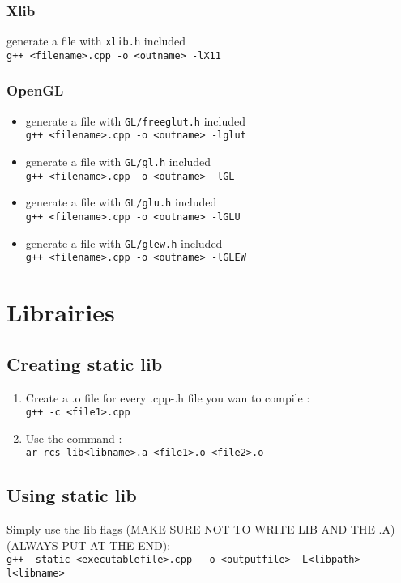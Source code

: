 \documentclass[12pt]{article}
\begin{document}
\subsubsection{Xlib}
generate a file with \verb|xlib.h| included \\ \verb|g++ <filename>.cpp -o <outname> -lX11|
\subsubsection{OpenGL}
\begin{itemize}
 \item generate a file with \verb|GL/freeglut.h| included \\ \verb|g++ <filename>.cpp -o <outname> -lglut|
 \item generate a file with \verb|GL/gl.h| included \\ \verb|g++ <filename>.cpp -o <outname> -lGL|
 \item generate a file with \verb|GL/glu.h| included \\ \verb|g++ <filename>.cpp -o <outname> -lGLU|
 \item generate a file with \verb|GL/glew.h| included \\ \verb|g++ <filename>.cpp -o <outname> -lGLEW|
\end{itemize}


\newpage
\section{Librairies}
\subsection{Creating static lib}
\begin{enumerate}
 \item Create a .o file for every .cpp-.h file you wan to compile : \\
       \verb|g++ -c <file1>.cpp|
 \item Use the command :\\
       \verb|ar rcs lib<libname>.a <file1>.o <file2>.o|
\end{enumerate}
\subsection{Using static lib}
Simply use the lib flags (MAKE SURE NOT TO WRITE LIB AND THE .A) (ALWAYS PUT AT THE END):\\
\verb|g++ -static <executablefile>.cpp  -o <outputfile> -L<libpath> -l<libname>|
\end{document}

